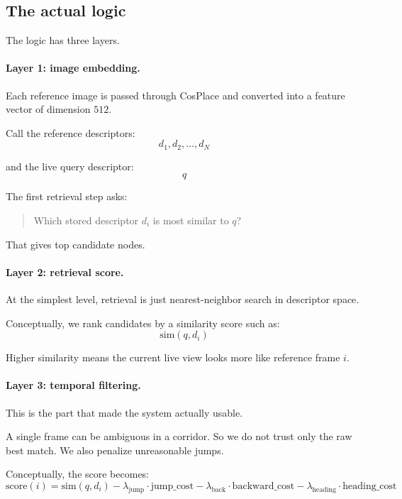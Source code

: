 \documentclass[11pt,a4paper]{article}
\begin{document}
\subsection{The actual logic}

The logic has three layers.

\paragraph{Layer 1: image embedding.}

Each reference image is passed through CosPlace and converted into a feature
vector of dimension $512$.

Call the reference descriptors:
\[
d_1, d_2, \dots, d_N
\]

and the live query descriptor:
\[
q
\]

The first retrieval step asks:

\begin{quote}
Which stored descriptor $d_i$ is most similar to $q$?
\end{quote}

That gives top candidate nodes.

\paragraph{Layer 2: retrieval score.}

At the simplest level, retrieval is just nearest-neighbor search in descriptor
space.

Conceptually, we rank candidates by a similarity score such as:
\[
\mathrm{sim}(q, d_i)
\]

Higher similarity means the current live view looks more like reference frame
$i$.

\paragraph{Layer 3: temporal filtering.}

This is the part that made the system actually usable.

A single frame can be ambiguous in a corridor.  So we do not trust only the raw
best match.  We also penalize unreasonable jumps.

Conceptually, the score becomes:
\[
\mathrm{score}(i) =
\mathrm{sim}(q, d_i)
- \lambda_{\text{jump}} \cdot \mathrm{jump\_cost}
- \lambda_{\text{back}} \cdot \mathrm{backward\_cost}
- \lambda_{\text{heading}} \cdot \mathrm{heading\_cost}
\]
\end{document}
